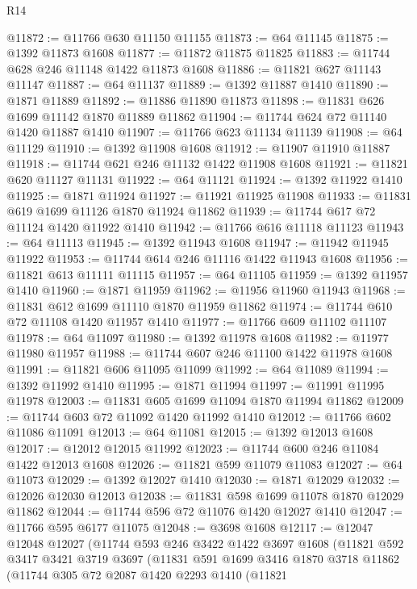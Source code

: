 \begin{lexlean}{R14}
\begin{coremodule}
@11872 := @11766 @630 @11150 @11155
@11873 := @64 @11145
@11875 := @1392 @11873 @1608
@11877 := @11872 @11875 @11825
@11883 := @11744 @628 @246 @11148 @1422 @11873 @1608
@11886 := @11821 @627 @11143 @11147
@11887 := @64 @11137
@11889 := @1392 @11887 @1410
@11890 := @1871 @11889
@11892 := @11886 @11890 @11873
@11898 := @11831 @626 @1699 @11142 @1870 @11889 @11862
@11904 := @11744 @624 @72 @11140 @1420 @11887 @1410
@11907 := @11766 @623 @11134 @11139
@11908 := @64 @11129
@11910 := @1392 @11908 @1608
@11912 := @11907 @11910 @11887
@11918 := @11744 @621 @246 @11132 @1422 @11908 @1608
@11921 := @11821 @620 @11127 @11131
@11922 := @64 @11121
@11924 := @1392 @11922 @1410
@11925 := @1871 @11924
@11927 := @11921 @11925 @11908
@11933 := @11831 @619 @1699 @11126 @1870 @11924 @11862
@11939 := @11744 @617 @72 @11124 @1420 @11922 @1410
@11942 := @11766 @616 @11118 @11123
@11943 := @64 @11113
@11945 := @1392 @11943 @1608
@11947 := @11942 @11945 @11922
@11953 := @11744 @614 @246 @11116 @1422 @11943 @1608
@11956 := @11821 @613 @11111 @11115
@11957 := @64 @11105
@11959 := @1392 @11957 @1410
@11960 := @1871 @11959
@11962 := @11956 @11960 @11943
@11968 := @11831 @612 @1699 @11110 @1870 @11959 @11862
@11974 := @11744 @610 @72 @11108 @1420 @11957 @1410
@11977 := @11766 @609 @11102 @11107
@11978 := @64 @11097
@11980 := @1392 @11978 @1608
@11982 := @11977 @11980 @11957
@11988 := @11744 @607 @246 @11100 @1422 @11978 @1608
@11991 := @11821 @606 @11095 @11099
@11992 := @64 @11089
@11994 := @1392 @11992 @1410
@11995 := @1871 @11994
@11997 := @11991 @11995 @11978
@12003 := @11831 @605 @1699 @11094 @1870 @11994 @11862
@12009 := @11744 @603 @72 @11092 @1420 @11992 @1410
@12012 := @11766 @602 @11086 @11091
@12013 := @64 @11081
@12015 := @1392 @12013 @1608
@12017 := @12012 @12015 @11992
@12023 := @11744 @600 @246 @11084 @1422 @12013 @1608
@12026 := @11821 @599 @11079 @11083
@12027 := @64 @11073
@12029 := @1392 @12027 @1410
@12030 := @1871 @12029
@12032 := @12026 @12030 @12013
@12038 := @11831 @598 @1699 @11078 @1870 @12029 @11862
@12044 := @11744 @596 @72 @11076 @1420 @12027 @1410
@12047 := @11766 @595 @6177 @11075
@12048 := @3698 @1608
@12117 := @12047
    @12048
    @12027
    (@11744
      @593
      @246
      @3422
      @1422
      @3697
      @1608
      (@11821
        @592
        @3417
        @3421
        @3719
        @3697
        (@11831
          @591
          @1699
          @3416
          @1870
          @3718
          @11862
          (@11744
            @305
            @72
            @2087
            @1420
            @2293
            @1410
            (@11821

\end{coremodule}
\end{lexlean}
